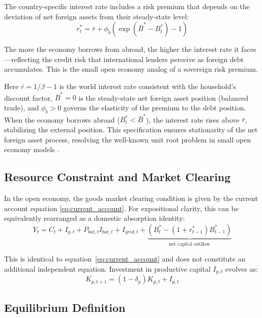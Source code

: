\documentclass[12pt, a4paper]{article}
\begin{document}
The country-specific interest rate includes a risk premium that depends on the deviation of net foreign assets from their steady-state level:
\begin{equation}
r^*_t = \bar{r} + \phi_b \left( \exp(\bar{B}^* - B^*_t) - 1 \right)
\label{eq:interest_premium}
\end{equation}

The more the economy borrows from abroad, the higher the interest rate it faces---reflecting the credit risk that international lenders perceive as foreign debt accumulates. This is the small open economy analog of a sovereign risk premium.

Here $\bar{r} = 1/\beta - 1$ is the world interest rate consistent with the household's discount factor, $\bar{B}^* = 0$ is the steady-state net foreign asset position (balanced trade), and $\phi_b > 0$ governs the elasticity of the premium to the debt position. When the economy borrows abroad ($B^*_t < \bar{B}^*$), the interest rate rises above $\bar{r}$, stabilizing the external position. This specification ensures stationarity of the net foreign asset process, resolving the well-known unit root problem in small open economy models \citep{schmittgrohe2003}.

\subsection{Resource Constraint and Market Clearing}

In the open economy, the goods market clearing condition is given by the current account equation \eqref{eq:current_account}. For expositional clarity, this can be equivalently rearranged as a domestic absorption identity:
\begin{equation}
Y_t = C_t + I_{p,t} + P_{bat,t} I_{bat,t} + I_{grid,t} + \underbrace{(B^*_t - (1+r^*_{t-1})B^*_{t-1})}_{\text{net capital outflow}}
\label{eq:goods_market_clearing}
\end{equation}

\noindent This is identical to equation~\eqref{eq:current_account} and does not constitute an additional independent equation. Investment in productive capital $I_{p,t}$ evolves as:
\begin{equation}
K_{p,t+1} = (1-\delta_p) K_{p,t} + I_{p,t}
\label{eq:productive_capital}
\end{equation}

\subsection{Equilibrium Definition}
\end{document}
